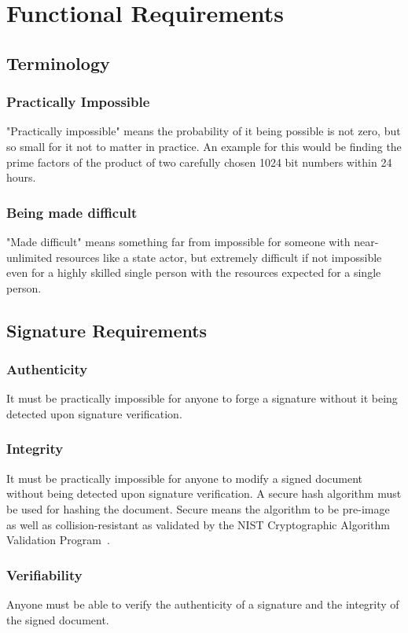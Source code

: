 \chapter*{Functional Requirements}
\label{ch:functionalrequirements}

\section{Terminology}
\subsection{Practically Impossible}
"Practically impossible" means the probability of it being possible is not zero, but so small for it not to matter in practice.
An example for this would be finding the prime factors of the product of two carefully chosen 1024 bit numbers within 24 hours.

\subsection{Being made difficult}
"Made difficult" means something far from impossible for someone with near-unlimited resources like a state actor,
but extremely difficult if not impossible even for a highly skilled single person with the resources expected for a single person.

\section{Signature Requirements}
\label{sec:signaturerequirements}
\subsection{Authenticity}
It must be practically impossible for anyone to forge a signature without it being detected upon signature verification.

\subsection{Integrity}
It must be practically impossible for anyone to modify a signed document without being detected upon signature verification.
A secure hash algorithm must be used for hashing the document.
Secure means the algorithm to be pre-image as well as collision-resistant as validated by the \gls{NIST} Cryptographic Algorithm Validation Program~\cite{nistcavp}.

\subsection{Verifiability}
Anyone must be able to verify the authenticity of a signature and the integrity of the signed document.

